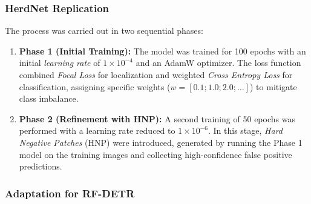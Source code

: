 \subsubsection{HerdNet Replication}

The process was carried out in two sequential phases:
\begin{enumerate}
    \item \textbf{Phase 1 (Initial Training):} The model was trained for 100 epochs with an initial \textit{learning rate} of $1\times10^{-4}$ and an AdamW optimizer. The loss function combined \textit{Focal Loss} for localization and weighted \textit{Cross Entropy Loss} for classification, assigning specific weights ($w=[0.1; 1.0; 2.0; \dots]$) to mitigate class imbalance.
    \item \textbf{Phase 2 (Refinement with HNP):} A second training of 50 epochs was performed with a learning rate reduced to $1\times10^{-6}$. In this stage, \textit{Hard Negative Patches} (HNP) were introduced, generated by running the Phase 1 model on the training images and collecting high-confidence false positive predictions.
\end{enumerate}

\subsubsection{Adaptation for RF-DETR}

